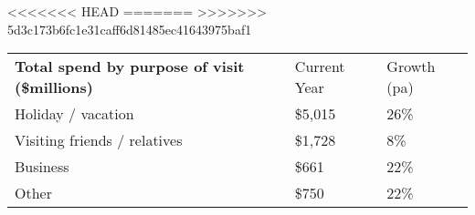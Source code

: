 <<<<<<< HEAD
=======
>>>>>>> 5d3c173b6fc1e31caff6d81485ec41643975baf1
\begin{tabular}[t]{p{4.85cm}>{\hfill}p{1.3cm}>{\hfill}p{1.35cm}}
 \textbf{Total spend by purpose of visit (\$millions)} & Current Year & Growth (pa) \\ 
 Holiday / vacation & \$5,015 & 26\% \\ 
  Visiting friends / relatives & \$1,728 & 8\% \\ 
  Business & \$661   & 22\% \\ 
  Other & \$750 & 22\% \\ 
  \end{tabular}
